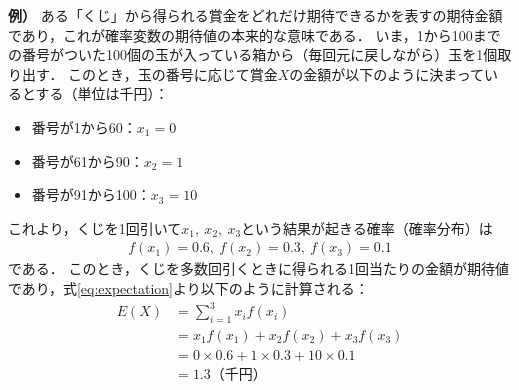 %
\vspace{0.5cm}
\noindent \textbf{例）}
%
ある「くじ」から得られる賞金をどれだけ期待できるかを表すの期待金額であり，これが確率変数の期待値の本来的な意味である．
%
いま，1から100までの番号がついた100個の玉が入っている箱から（毎回元に戻しながら）玉を1個取り出す．
%
このとき，玉の番号に応じて賞金$ X $の金額が以下のように決まっているとする（単位は千円）：
%
\begin{itemize}
\item
番号が1から60：$ x_{1}=0 $
\item
番号が61から90：$ x_{2}=1 $
\item
番号が91から100：$ x_{3}=10 $
\end{itemize}
%
これより，くじを1回引いて$ x_{1},\ x_{2},\ x_{3} $という結果が起きる確率（確率分布）は
%
\begin{align*}
	f(x_{1})=0.6,\ f(x_{2})=0.3,\ f(x_{3})=0.1
\end{align*}
%
である．
%
このとき，くじを多数回引くときに得られる1回当たりの金額が期待値であり，式\eqref{eq:expectation}より以下のように計算される：
%
\begin{align*}
	E(X) &= \sum_{i=1}^{3} x_{i}f(x_{i})\\
	&= x_{1}f(x_{1}) + x_{2}f(x_{2}) + x_{3}f(x_{3}) \\
	&= 0\times 0.6 + 1\times 0.3 + 10 \times 0.1 \\
	&= 1.3（千円）
\end{align*}
%

%


